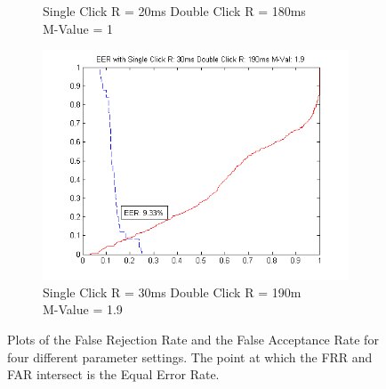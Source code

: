 \documentclass[conference]{IEEEtran}
\begin{document}
\begin{figure}[]
\begin{subfigure}{.5\textwidth}
  \caption{Single Click R = 20ms Double Click R = 180ms\\M-Value = 1}
  \label{fig:sfig3}
\end{subfigure}%
\begin{subfigure}{.5\textwidth}
  \centering
  \includegraphics[width=.8\linewidth]{19M}
  \caption{Single Click R = 30ms Double Click R = 190m\\ M-Value = 1.9}
  \label{fig:sfig4}
\end{subfigure}
\caption{Plots of the False Rejection Rate and the False Acceptance Rate for four different parameter settings. The point at which the FRR and FAR intersect is the Equal Error Rate. }
\label{fig:fig}
\end{figure}
\end{document}

